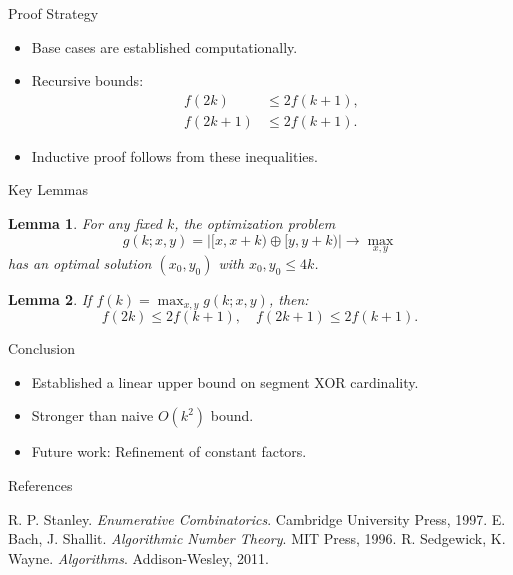 \documentclass[handout,notheorems]{beamer}
\newtheorem*{lemma}{Lemma}
\theoremstyle{definition}
\begin{document}
\begin{frame}{Proof Strategy}
    \begin{itemize}
        \item Base cases are established computationally.
        \item Recursive bounds:
        \begin{align*}
            f(2k) &\leq 2f(k+1),\\
            f(2k+1) &\leq 2f(k+1).
        \end{align*}
        \item Inductive proof follows from these inequalities.
    \end{itemize}
\end{frame}

\begin{frame}{Key Lemmas}
    \begin{lemma}
        For any fixed $k$, the optimization problem \[ g(k; x, y) = |[x, x+k) \oplus [y, y+k)| \to \max_{x, y} \] has an optimal solution $(x_0, y_0)$ with $x_0, y_0 \leq 4k$.
    \end{lemma}
    \begin{lemma}
        If $f(k) = \max_{x, y} g(k; x, y)$, then:
        \[ f(2k) \leq 2f(k+1), \quad f(2k+1) \leq 2f(k+1). \]
    \end{lemma}
\end{frame}

\begin{frame}{Conclusion}
    \begin{itemize}
        \item Established a linear upper bound on segment XOR cardinality.
        \item Stronger than naive $O(k^2)$ bound.
        \item Future work: Refinement of constant factors.
    \end{itemize}
\end{frame}

\begin{frame}{References}
    \begin{thebibliography}{9}
         R. P. Stanley. \emph{Enumerative Combinatorics}. Cambridge University Press, 1997.
         E. Bach, J. Shallit. \emph{Algorithmic Number Theory}. MIT Press, 1996.
         R. Sedgewick, K. Wayne. \emph{Algorithms}. Addison-Wesley, 2011.
    \end{thebibliography}
\end{frame}
\end{document}
